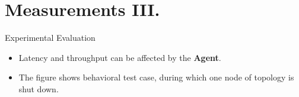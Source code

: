\documentclass[hyperref={pdfpagelabels=false, unicode},pdf,slideColor,fyma,9pt]{beamer}
\begin{document}
    \section{Measurements III.}
    \begin{frame}{Experimental Evaluation}
      \begin{itemize}
          \setlength\itemsep{0.5em}
          \item Latency and throughput can be affected by the \textbf{Agent}.
          \item The figure shows behavioral test case, during which one node of topology is shut down.
      \end{itemize}
      \begin{figure}[ht]
        \begin{center}
        \end{center}
      \end{figure}
    \end{frame}
\end{document}
